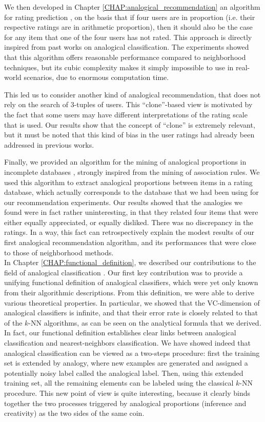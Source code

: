 We then developed in Chapter \ref{CHAP:analogical_recommendation} an algorithm
for rating prediction \cite{HugPraRicISMIS15}, on the basis that if four users
are in proportion (i.e. their respective ratings are in arithmetic proportion),
then it should also be the case for any item that one of the four users has not
rated. This approach is directly inspired from past works on analogical
classification. The experiments showed that this algorithm offers reasonable
performance compared to neighborhood techniques, but its cubic complexity makes
it simply impossible to use in real-world scenarios, due to enormous
computation time.

This led us to consider another kind of analogical recommendation, that does
not rely on the search of $3$-tuples of users. This ``clone''-based view
\cite{HugPraRicSerFuzzIEEE16} is motivated by the fact that some users may
have different interpretations of the rating scale that is used. Our results
show that the concept of ``clone'' is extremely relevant, but it must be noted
that this kind of bias in the user ratings had already been addressed in
previous works.

Finally, we provided an algorithm for the mining of analogical proportions in
incomplete databases \cite{HugPraRicSerLFA16}, strongly inspired from the
mining of association rules. We used this algorithm to extract analogical
proportions between items in a rating database, which actually corresponds to
the database that we had been using for our recommendation experiments. Our
results showed that the analogies we found were in fact rather
uninteresting, in that they related four items that were either equally
appreciated, or equally disliked. There was no discrepancy in the ratings. In
a way, this fact can retrospectively explain the modest results of our first
analogical recommendation algorithm, and its performances that were close to
those of neighborhood methods.\\

In Chapter \ref{CHAP:functional_definition}, we described our contributions to
the field of analogical classification \cite{HugPraRicSerECAI16}. Our first key
contribution was to provide a unifying functional definition of analogical
classifiers, which were yet only known from their algorithmic descriptions.
From this definition, we were able to derive various theoretical properties. In
particular, we showed that the VC-dimension of analogical classifiers is
infinite, and that their error rate is closely related to that of the $k$-NN
algorithms, as can be seen on the analytical formula that we derived. In fact,
our functional definition establishes clear links between analogical
classification and nearest-neighbors classification. We have showed indeed that
analogical classification can be viewed as a two-steps procedure: first the
training set is extended by analogy, where new examples are generated and
assigned a potentially noisy label called the analogical label. Then, using
this extended training set, all the remaining elements can be labeled using the
classical $k$-NN procedure. This new point of view is quite interesting,
because it clearly binds together the two processes triggered by analogical
proportions (inference and creativity) as the two sides of the same coin.

